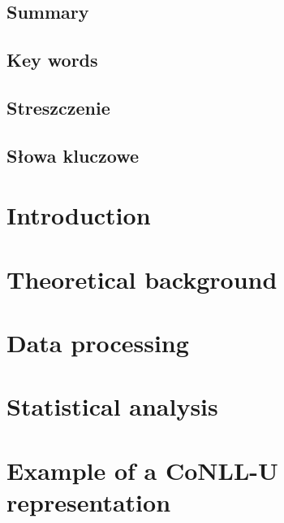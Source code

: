 \documentclass[12pt]{report}
\begin{document}


\pagestyle{empty}
\section*{Summary}
%
\section*{Key words}
%

\newpage
\pagestyle{empty}
\section*{Streszczenie}
%
\section*{Słowa kluczowe}
%

\tableofcontents

\pagestyle{fancy}
\chapter{Introduction}\label{ch:introduction}
\chapter{Theoretical background}
    
\chapter{Data processing}
    
\chapter{Statistical analysis}
    

\appendix
\chapter{Example of a CoNLL-U representation}\label{ap:conllu}
    


\end{document}
